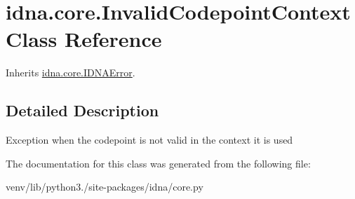 \hypertarget{classidna_1_1core_1_1_invalid_codepoint_context}{}\section{idna.\+core.\+Invalid\+Codepoint\+Context Class Reference}
\label{classidna_1_1core_1_1_invalid_codepoint_context}


Inherits \hyperlink{classidna_1_1core_1_1_i_d_n_a_error}{idna.\+core.\+I\+D\+N\+A\+Error}.



\subsection{Detailed Description}
\begin{DoxyVerb}Exception when the codepoint is not valid in the context it is used \end{DoxyVerb}
 

The documentation for this class was generated from the following file\+:\begin{DoxyCompactItemize}
\item 
venv/lib/python3./site-\/packages/idna/core.\+py\end{DoxyCompactItemize}
